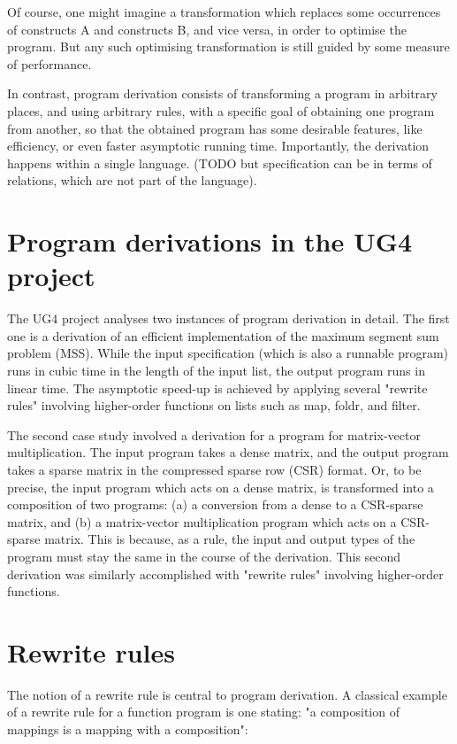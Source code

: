 \documentclass[bsc,frontabs,oneside,singlespacing,parskip,deptreport]{infthesis}
\theoremstyle{definition}
\begin{document}
Of course, one might imagine a transformation which replaces some
occurrences of constructs A and constructs B, and vice versa, in order
to optimise the program. But any such optimising transformation is
still guided by some measure of performance.

In contrast, program derivation consists of transforming a program in
arbitrary places, and using arbitrary rules, with a specific goal of
obtaining one program from another, so that the obtained program has
some desirable features, like efficiency, or even faster asymptotic
running time. Importantly, the derivation happens within a single
language. (TODO but specification can be in terms of relations, which
are not part of the language).

\section{Program derivations in the UG4 project}
\label{sec:progr-deriv-ug4}

The UG4 project analyses two instances of program derivation in
detail. The first one is a derivation of an efficient implementation
of the maximum segment sum problem (MSS). While the input
specification (which is also a runnable program) runs in cubic time in
the length of the input list, the output program runs in linear
time. The asymptotic speed-up is achieved by applying several "rewrite
rules" involving higher-order functions on lists such as map, foldr,
and filter.

The second case study involved a derivation for a program for
matrix-vector multiplication. The input program takes a dense matrix,
and the output program takes a sparse matrix in the compressed sparse
row (CSR) format. Or, to be precise, the input program which acts on a
dense matrix, is transformed into a composition of two programs: (a) a
conversion from a dense to a CSR-sparse matrix, and (b) a
matrix-vector multiplication program which acts on a CSR-sparse
matrix. This is because, as a rule, the input and output types of the
program must stay the same in the course of the derivation. This
second derivation was similarly accomplished with "rewrite rules"
involving higher-order functions.

\section{Rewrite rules}
\label{sec:rewrite-rules}

The notion of a rewrite rule is central to program derivation. A
classical example of a rewrite rule for a function program is one
stating: "a composition of mappings is a mapping with a composition":
\end{document}
